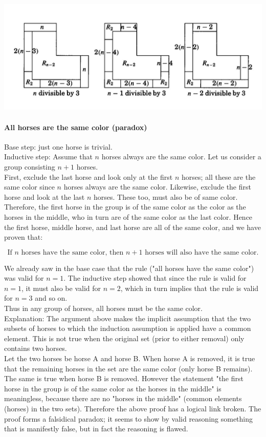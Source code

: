 \documentclass[a4paper, 11pt, twoside]{article}
\begin{document}
\includegraphics[width=\linewidth]{images/L3}

\paragraph{All horses are the same color (paradox)}

Base step: just one horse is trivial.\\

Inductive step: Assume that $n$ horses always are the same color. Let us consider a group consisting $n+1$ horses.\\

First, exclude the last horse and look only at the first $n$ horses; all these are the same color since $n$ horses always are the same color. Likewise, exclude the first horse and look at the last $n$ horses. These too, must also be of same color. Therefore, the first horse in the group is of the same color as the color as the horses in the middle, who in turn are of the same color as the last color. Hence the first horse, middle horse, and last horse are all of the same color, and we have proven that:

\[\text{If } n \text{ horses have the same color, then } n+1 \text{ horses will also have the same color.}\]

We already saw in the base case that the rule ("all horses have the same color") was valid for $n=1$. The inductive step showed that since the rule is valid for $n=1$, it must also be valid for $n=2$, which in turn implies that the rule is valid for $n=3$ and so on.\\

Thus in any group of horses, all horses must be the same color.\\

Explanation: The argument above makes the implicit assumption that the two subsets of horses to which the induction assumption is applied have a common element. This is not true when the original set (prior to either removal) only contains two horses.\\

Let the two horses be horse A and horse B. When horse A  is removed, it is true that the remaining horses in  the set  are the same color (only horse B remains). The same is true when horse B is removed. However the statement "the first horse in the group is of the same color as the horses in the middle" is meaningless, because there are no "horses in the middle" (common elements (horses) in the two sets). Therefore the above proof has a logical link broken. The proof forms a falsidical paradox; it seems to show by valid reasoning something that is manifestly false, but in fact the reasoning is flawed.\\
\end{document}
